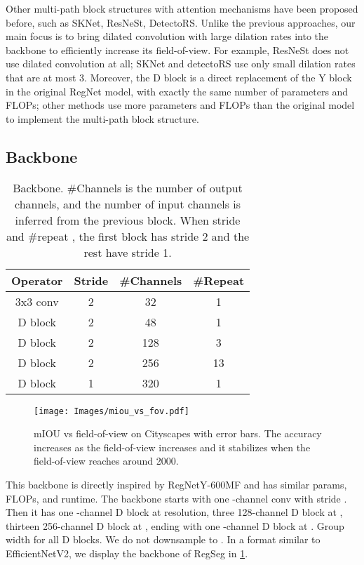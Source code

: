 \documentclass[10pt,twocolumn,letterpaper]{article}
\begin{document}
Other multi-path block structures with attention mechanisms have been proposed before, such as SKNet\cite{sknet}, ResNeSt\cite{resnest}, DetectoRS\cite{detectoRS}. Unlike the previous approaches, our main focus is to bring dilated convolution with large dilation rates into the backbone to efficiently increase its field-of-view. For example, ResNeSt does not use dilated convolution at all; SKNet and detectoRS use only small dilation rates that are at most 3. Moreover, the D block is a direct replacement of the Y block in the original RegNet model, with exactly the same number of parameters and FLOPs; other methods use more parameters and FLOPs than the original model to implement the multi-path block structure.





\subsection{Backbone}
\label{sec:backbone}
\begin{table}
  \centering
  \begin{tabular}{c|c|c|c}
    \toprule
    Operator & Stride & \#Channels & \#Repeat \\
    \midrule
    3x3 conv & 2 & 32 & 1\\
    D block & 2 & 48 & 1\\
    D block & 2 & 128 & 3\\
    D block & 2 & 256 & 13\\
    D block & 1 & 320 & 1\\
    \bottomrule
  \end{tabular}
  \caption{Backbone. \#Channels is the number of output channels, and the number of input channels is inferred from the previous block. When stride  and \#repeat , the first block has stride 2 and the rest have stride 1.}
  \label{tab:backbone}
\end{table}
\begin{figure}
  \centering
    \texttt{[image: Images/miou\_vs\_fov.pdf]}

   \caption{mIOU vs field-of-view on Cityscapes with error bars. The accuracy increases as the field-of-view increases and it stabilizes when the field-of-view reaches around 2000.}
   \label{fig:miou_vs_fov}
\end{figure}
This backbone is directly inspired by RegNetY-600MF\cite{regnet} and has similar params, FLOPs, and runtime. The backbone starts with one -channel  conv with stride . Then it has one -channel D block at  resolution, three 128-channel D block at , thirteen 256-channel D block at , ending with one -channel D block at . Group width  for all D blocks. We do not downsample to . In a format similar to EfficientNetV2\cite{efficientnetv2}, we display the backbone of RegSeg in \cref{tab:backbone}.
\end{document}
